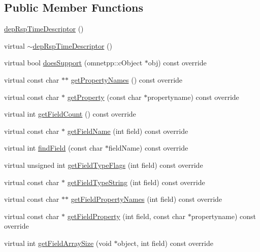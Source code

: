 \subsection*{Public Member Functions}
\begin{DoxyCompactItemize}
\item 
\hyperlink{classdepRspTimeDescriptor_a1c9b594074be83beb7009019d66da91e}{dep\+Rsp\+Time\+Descriptor} ()
\item 
virtual \hyperlink{classdepRspTimeDescriptor_a0cb36f001ae3e47a6d6156b8c7e66e19}{$\sim$dep\+Rsp\+Time\+Descriptor} ()
\item 
virtual bool \hyperlink{classdepRspTimeDescriptor_ac514b2445c49b0a2fde22c730bdd8155}{does\+Support} (omnetpp\+::c\+Object $\ast$obj) const override
\item 
virtual const char $\ast$$\ast$ \hyperlink{classdepRspTimeDescriptor_a3909adf8b159cd8da2cdb9aa135a77ba}{get\+Property\+Names} () const override
\item 
virtual const char $\ast$ \hyperlink{classdepRspTimeDescriptor_a2426bb36989259be75b4ac3c7c18af5b}{get\+Property} (const char $\ast$propertyname) const override
\item 
virtual int \hyperlink{classdepRspTimeDescriptor_ab44ba5e8986e63b20c2ced23f47a011c}{get\+Field\+Count} () const override
\item 
virtual const char $\ast$ \hyperlink{classdepRspTimeDescriptor_a764ef69505cdeca4cefbda8aa3820bc3}{get\+Field\+Name} (int field) const override
\item 
virtual int \hyperlink{classdepRspTimeDescriptor_aa50291bed26663e0840e5a9278af4145}{find\+Field} (const char $\ast$field\+Name) const override
\item 
virtual unsigned int \hyperlink{classdepRspTimeDescriptor_aefc601d75b14b0e264693c32f35b084e}{get\+Field\+Type\+Flags} (int field) const override
\item 
virtual const char $\ast$ \hyperlink{classdepRspTimeDescriptor_a230884891fa25dd60490fbf1b72dd5ab}{get\+Field\+Type\+String} (int field) const override
\item 
virtual const char $\ast$$\ast$ \hyperlink{classdepRspTimeDescriptor_a35ad7064d9ca791511a1d570f957cb34}{get\+Field\+Property\+Names} (int field) const override
\item 
virtual const char $\ast$ \hyperlink{classdepRspTimeDescriptor_a7c5adef7085e1e13c680e060fcdfd5a2}{get\+Field\+Property} (int field, const char $\ast$propertyname) const override
\item 
virtual int \hyperlink{classdepRspTimeDescriptor_a1250376ef742580dc83db84ce3bc2283}{get\+Field\+Array\+Size} (void $\ast$object, int field) const override

\end{DoxyCompactItemize}
